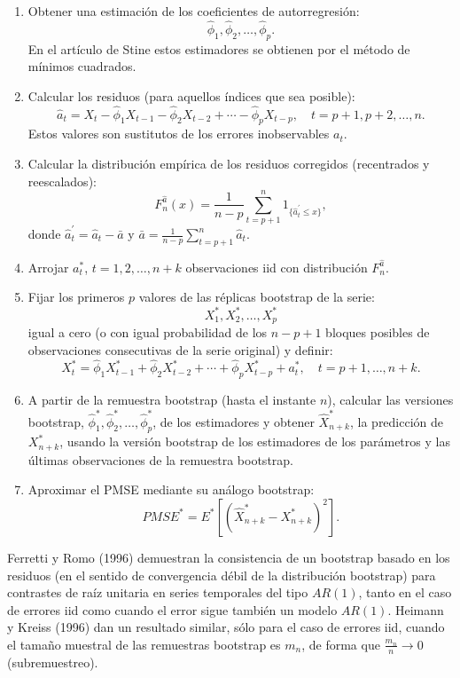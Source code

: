 \documentclass[]{book}
\theoremstyle{definition}
\theoremstyle{definition}
\theoremstyle{definition}
\theoremstyle{remark}
\begin{document}
\begin{enumerate}
\def\labelenumi{\arabic{enumi}.}
\item
  Obtener una estimación de los coeficientes de autorregresión:
  \[\widehat{\phi}_1,\widehat{\phi}_2,\ldots ,\widehat{\phi}_{p}.\]En el
  artículo de Stine estos estimadores se obtienen por el método de
  mínimos cuadrados.
\item
  Calcular los residuos (para aquellos índices que sea posible):
  \[\widehat{a}_{t}=X_{t}-\widehat{\phi}_1X_{t-1}-\widehat{\phi}
  _2X_{t-2}+\cdots -\widehat{\phi}_{p}X_{t-p},\quad t=p+1,p+2,\ldots ,n.\]
  Estos valores son sustitutos de los errores inobservables \(a_{t}\).
\item
  Calcular la distribución empírica de los residuos corregidos
  (recentrados y reescalados):
  \[F_n^{\widehat{a}}(x)=\frac{1}{n-p}\sum_{t=p+1}^{n}1_{\{\widehat{a}_{t}^{\prime}\leq x\}},\]
  donde \(\widehat{a}_{t}^{\prime}=\widehat{a}_{t}-\bar{a}\) y
  \(\bar{a}=\frac{1}{n-p}\sum_{t=p+1}^{n}\widehat{a}_{t}\).
\item
  Arrojar \(a_{t}^{\ast}\), \(t=1,2,\ldots ,n+k\) observaciones iid con
  distribución \(F_n^{\widehat{a}}\).
\item
  Fijar los primeros \(p\) valores de las réplicas bootstrap de la
  serie: \[X_1^{\ast},X_2^{\ast},\ldots ,X_{p}^{\ast}\] igual a cero (o
  con igual probabilidad de los \(n-p+1\) bloques posibles de
  observaciones consecutivas de la serie original) y definir:
  \[X_{t}^{\ast}=\widehat{\phi}_1X_{t-1}^{\ast}+\widehat{\phi}_2
  X_{t-2}^{\ast}+\cdots +\widehat{\phi}_{p}X_{t-p}^{\ast}+a_{t}^{\ast},
  \quad t=p+1,\ldots ,n+k.\]
\item
  A partir de la remuestra bootstrap (hasta el instante \(n\)), calcular
  las versiones bootstrap,
  \(\widehat{\phi}_1^{\ast},\widehat{\phi} _2^{\ast},\ldots ,\widehat{\phi}_{p}^{\ast}\),
  de los estimadores y obtener \(\widehat{X}_{n+k}^{\ast}\), la
  predicción de \(X_{n+k}^{\ast}\), usando la versión bootstrap de los
  estimadores de los parámetros y las últimas observaciones de la
  remuestra bootstrap.
\item
  Aproximar el PMSE mediante su análogo bootstrap:
  \[PMSE^{\ast}=E^{\ast}\left[ \left( \widehat{X}_{n+k}^{\ast}-X_{n+k}^{\ast
  } \right)^2\right] .\]
\end{enumerate}

Ferretti y Romo (1996) demuestran la consistencia de un bootstrap basado
en los residuos (en el sentido de convergencia débil de la distribución
bootstrap) para contrastes de raíz unitaria en series temporales del
tipo \(AR(1)\), tanto en el caso de errores iid como cuando el error
sigue también un modelo \(AR(1)\). Heimann y Kreiss (1996) dan un
resultado similar, sólo para el caso de errores iid, cuando el tamaño
muestral de las remuestras bootstrap es \(m_n\), de forma que
\(\frac{m_n}{n} \rightarrow 0\) (subremuestreo).
\end{document}
